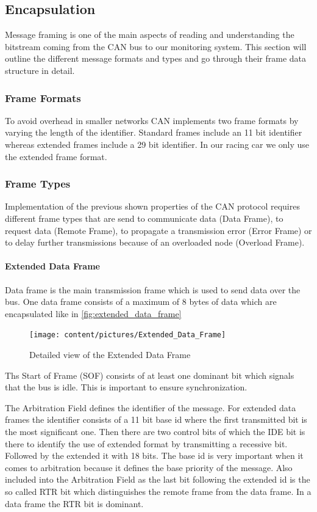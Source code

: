 \subsection{Encapsulation}
Message framing is one of the main aspects of reading and understanding the
bitstream coming from the CAN bus to our monitoring system. This section will
outline the different message formats and types and go through their frame data
structure in detail.
	\subsubsection{Frame Formats}
	To avoid overhead in smaller networks CAN implements two frame formats by
	varying the length of the identifier. Standard frames include an 11 bit
	identifier whereas extended frames include a 29 bit identifier. In our racing
	car we only use the extended frame format.
	\subsubsection{Frame Types}
	Implementation of the previous shown properties of the CAN protocol requires
	different frame types that are send to communicate data (Data Frame), to
	request data (Remote Frame), to propagate a transmission error (Error Frame) or
	to delay further transmissions because of an overloaded node (Overload Frame).
	\paragraph{Extended Data Frame}
	Data frame is the main transmission frame which is used to send data over the
	bus. One data frame consists of a maximum of 8 bytes of data which are
	encapsulated like in \autoref{fig:extended_data_frame}
	
	\begin{figure}[htb] \centering
		\texttt{[image: content/pictures/Extended\_Data\_Frame]}
		\caption{Detailed view of the Extended Data Frame}
		\label{fig:extended_data_frame}
	\end{figure}
	
	Ths Start of Frame (SOF) consists of at least one dominant bit which signals
	that the bus is idle. This is important to ensure synchronization.
	
	The Arbitration Field defines the identifier of the message. For extended data
	frames the identifier consists of a 11 bit base id where the first transmitted
	bit is the most significant one. Then there are two control bits of which the
	IDE bit is there to identify the use of extended format by transmitting a
	recessive bit. Followed by the extended it with 18 bits. The base id is very
	important when it comes to arbitration because it defines the base priority of
	the message.
	Also included into the Arbitration Field as the last bit following the extended
	id is the so called RTR bit which distinguishes the remote frame from the data
	frame. In a data frame the RTR bit is dominant.
	
